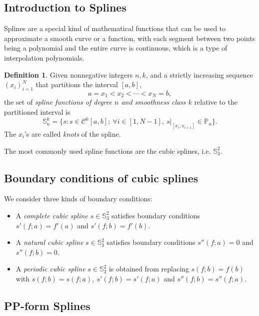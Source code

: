 \documentclass[a4paper]{article}
\theoremstyle{definition}
\newtheorem{definition}{Definition}
\begin{document}
\subsection{Introduction to Splines}

Splines are a special kind of mathematical functions that can be used to approximate a smooth curve or a function, with each segment between two points being a polynomial and the entire curve is continuous, which is a type of interpolation polynomials. 

\begin{definition}
  Given nonnegative integers $n, k$, and a strictly increasing sequence $(x_i)_{i = 1}^N$ that partitions the interval $[a, b]$, 
  \begin{equation}
    a = x_1 < x_2 < \cdots < x_N = b,
    \label{eq:partition}
  \end{equation}
  the set of \textit{spline functions of degree $n$ and smoothness class $k$} relative to the partitioned interval is 
  \begin{equation}
    \mathbb{S}_n^k = \{s: s \in \mathcal{C}^k[a, b];\ \forall i \in [1, N - 1],\ s\big|_{[x_i, x_{i + 1}]} \in \mathbb{P}_n\}.
    \label{eq:spline-set}
  \end{equation}
  The $x_i$'s are called \textit{knots} of the spline.
\end{definition}

The most commonly used spline functions are the cubic splines, i.e. $\mathbb{S}_3^2$.

\subsection{Boundary conditions of cubic splines}

We consider three kinds of boundary conditions:
\begin{itemize}
  \item A \textit{complete cubic spline} $s \in \mathbb{S}_3^2$ satisfies boundary conditions $s'(f; a) = f'(a)$ and $s'(f; b) = f'(b)$.
  \item A \textit{natural cubic spline} $s \in \mathbb{S}_3^2$ satisfies boundary conditions $s''(f; a) = 0$ and $s''(f; b) = 0$.
  \item A \textit{periodic cubic spline} $s \in \mathbb{S}_3^2$ is obtained from replacing $s(f; b) = f(b)$ with $s(f; b) = s(f; a),\ s'(f; b) = s'(f; a)$ and $s''(f; b) = s''(f; a)$.
\end{itemize}

\subsection{PP-form Splines}
\label{sec:pp-form-splines}
\end{document}
